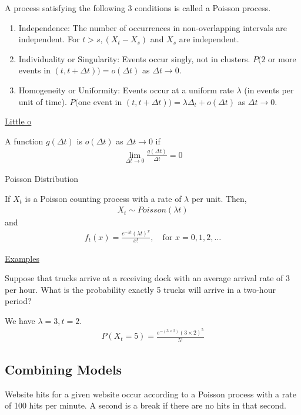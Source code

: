 \documentclass{article}
\begin{document}
A process satisfying the following 3 conditions is called a Poisson process. 
\begin{enumerate}
    \item Independence: The number of occurrences in non-overlapping intervals are independent. For $t > s, (X_t - X_s)$ and $X_s$ are independent.
    \item Individuality or Singularity: Events occur singly, not in clusters. $P(2 $ or more events in $(t,t+\Delta t)$$) = o(\Delta t)$ as $\Delta t \to 0$.
    \item Homogeneity or Uniformity: Events occur at a uniform rate $\lambda$ (in events per unit of time). $P($one event in $(t,t+\Delta t)$$) = \lambda \Delta_t + o(\Delta t)$ as $ \Delta t \to 0.$
\end{enumerate}

\underline{Little o}

A function $g(\Delta t)$ is $o(\Delta t)$ as $\Delta t \to 0$ if
\begin{align*}
    \lim_{\Delta t \to 0}\frac{g(\Delta t)}{\Delta t} = 0
\end{align*}

Poisson Distribution

If $X_t$ is a Poisson counting process with a rate of $\lambda$ per unit. Then,
\begin{align*}
    X_t \sim Poisson(\lambda t)
\end{align*}
and
\begin{align*}
    f_t(x) = \frac{e^{-\lambda t}(\lambda t)^x}{x!}, \quad \text{for } x = 0,1,2,\ldots
\end{align*}

\underline{Examples}

Suppose that trucks arrive at a receiving dock with an average arrival rate of 3 per hour. What is the probability exactly 5 trucks will arrive in a two-hour period?

We have $\lambda = 3, t = 2$.
\begin{align*}
    P(X_t = 5) = \frac{e^{-(3 \times 2)}(3 \times 2)^5}{5!}
\end{align*}


\subsection{Combining Models}

Website hits for a given website occur according to a Poisson process with a rate of 100 hits per minute. A second is a break if there are no hits in that second.
\end{document}

